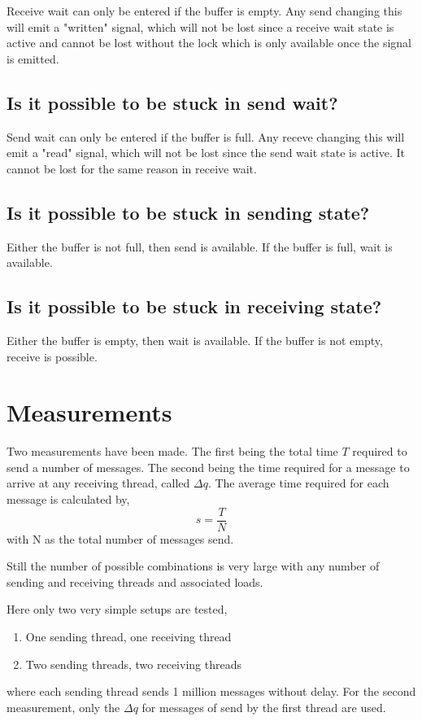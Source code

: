 \documentclass[12pt]{article}
\begin{document}
Receive wait can only be entered if the buffer is empty. Any send changing this
will emit a "written" signal, which will not be lost since a receive wait state is active
and cannot be lost without the lock which is only available once the signal is emitted.

\subsection{Is it possible to be stuck in send wait?}

Send wait can only be entered if the buffer is full. Any receve changing this
will emit a "read" signal, which will not be lost since the send wait state is active.
It cannot be lost for the same reason in receive wait.

\subsection{Is it possible to be stuck in sending state?}

Either the buffer is not full, then send is available. If the buffer is full, wait is available.

\subsection{Is it possible to be stuck in receiving state?}

Either the buffer is empty, then wait is available. If the buffer is not empty, receive is possible.

\section{Measurements}
Two measurements have been made. The first being the total time $T$ required to send a number of messages.
The second being the time required for a message to arrive at any receiving thread, called $\Delta q$.
The average time required for each message is calculated by,
\begin{equation}
 s = \frac{T}{N}
\end{equation}
with N as the total number of messages send.

Still the number of possible combinations is very large with any number of sending and receiving threads
and associated loads.

Here only two very simple setups are tested,
\begin{enumerate}
 \item One sending thread, one receiving thread
 \item Two sending threads, two receiving threads
\end{enumerate}
where each sending thread sends 1 million messages without delay.
For the second measurement, only the $\Delta q$ for messages of send by the
first thread are used.
\end{document}
